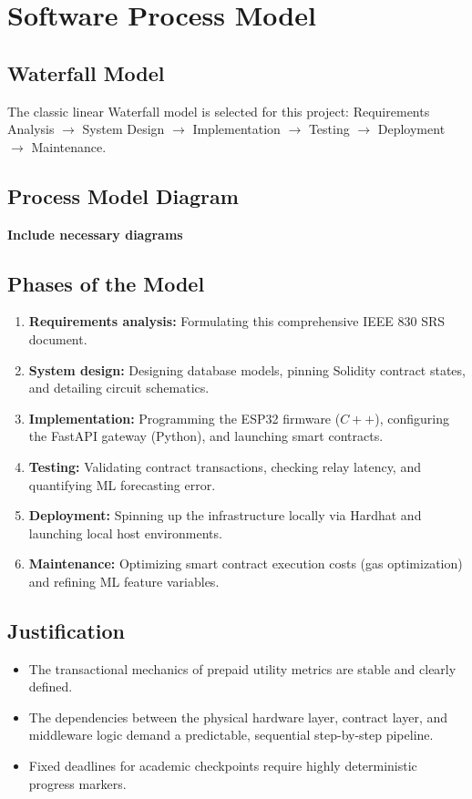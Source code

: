 \section{Software Process Model}

\subsection{Waterfall Model}
The classic linear Waterfall model is selected for this project: Requirements Analysis $\rightarrow$ System Design $\rightarrow$ Implementation $\rightarrow$ Testing $\rightarrow$ Deployment $\rightarrow$ Maintenance.

\subsection{Process Model Diagram}
\textbf{Include necessary diagrams}

\subsection{Phases of the Model}
\begin{enumerate}[leftmargin=*]
  \item \textbf{Requirements analysis:} Formulating this comprehensive IEEE 830 SRS document.
  \item \textbf{System design:} Designing database models, pinning Solidity contract states, and detailing circuit schematics.
  \item \textbf{Implementation:} Programming the ESP32 firmware ($C++$), configuring the FastAPI gateway (Python), and launching smart contracts.
  \item \textbf{Testing:} Validating contract transactions, checking relay latency, and quantifying ML forecasting error.
  \item \textbf{Deployment:} Spinning up the infrastructure locally via Hardhat and launching local host environments.
  \item \textbf{Maintenance:} Optimizing smart contract execution costs (gas optimization) and refining ML feature variables.
\end{enumerate}

\subsection{Justification}
\begin{itemize}[leftmargin=*]
  \item The transactional mechanics of prepaid utility metrics are stable and clearly defined.
  \item The dependencies between the physical hardware layer, contract layer, and middleware logic demand a predictable, sequential step-by-step pipeline.
  \item Fixed deadlines for academic checkpoints require highly deterministic progress markers.

\end{itemize}